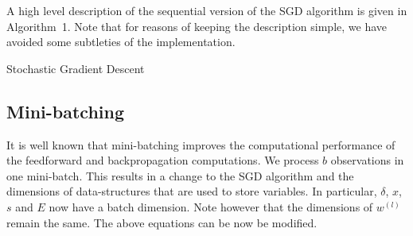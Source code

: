 \documentclass{article}
\newcommand{\be}{\begin{equation}}
\newcommand{\ee}{\end{equation}}
\begin{document}
A high level description of the sequential version of the SGD algorithm is given in Algorithm~1. Note that for reasons of keeping the description simple, we have avoided some subtleties of the implementation. 

\begin{algorithm}
\caption{{\sc Stochastic Gradient Descent}}
\label{algo:sequential}

\begin{algorithmic}[1]
\EndFor

	\EndFor
	\EndFor
\EndWhile

\end{algorithmic}
\end{algorithm}



%
%





\subsection{Mini-batching}
It is well known that mini-batching improves the computational performance of the feedforward and backpropagation computations.  We process $b$ observations in one mini-batch. This results in a change to the SGD algorithm and the dimensions of data-structures that are used to store variables. In particular, $\delta$, $x$, $s$ and $E$ now have a batch dimension. Note however that the dimensions of $w^{(l)}$ remain the same. The above equations can be now be modified.
\end{document}

